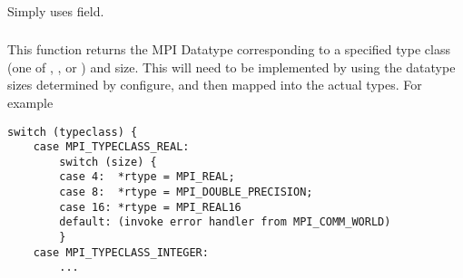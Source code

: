 \documentclass{article}
\begin{document}
\noindent{}\\
\\
\\
\\
\\
\\
\\
\\
\\
\\
\\
\\
\\
\\
\\
\\
\\
\\

\subsubsection{}
Simply uses  field.

\subsubsection{}
This function returns the MPI Datatype corresponding to a specified type class
(one of , , or
) and size.  This will need to be implemented
by using the datatype sizes determined by configure, and then mapped into 
the actual types.  For example
\begin{verbatim}
switch (typeclass) {
    case MPI_TYPECLASS_REAL:
        switch (size) {
        case 4:  *rtype = MPI_REAL;
        case 8:  *rtype = MPI_DOUBLE_PRECISION;
        case 16: *rtype = MPI_REAL16
        default: (invoke error handler from MPI_COMM_WORLD)
        }
    case MPI_TYPECLASS_INTEGER:
        ...
\end{verbatim}
\end{document}
